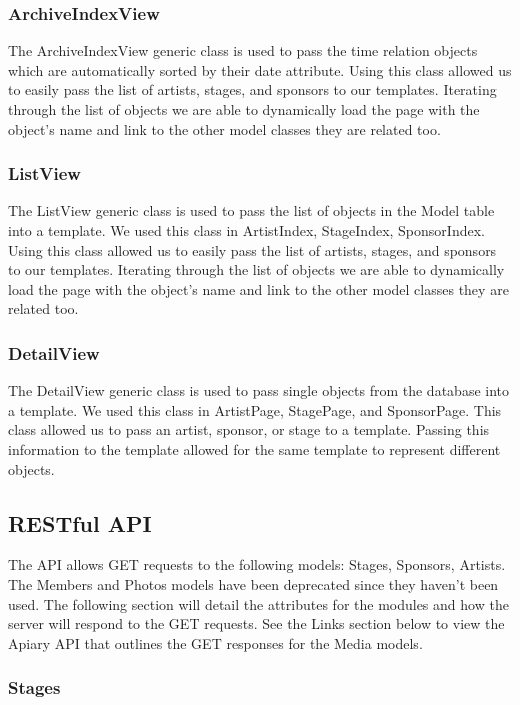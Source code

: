 \documentclass[12pt,english]{scrartcl}
\begin{document}
\subsubsection{ArchiveIndexView}
The ArchiveIndexView generic class is used to pass the time relation objects which are automatically sorted 
by their date attribute. Using this class allowed us to easily pass the list of artists, stages, and sponsors to our templates.
Iterating through the list of objects we are able to dynamically load the page with the object's name and link to the other model classes they are related too.

\subsubsection{ListView}
The ListView generic class is used to pass the list of objects in the Model table into a template. We used this class in ArtistIndex, StageIndex, SponsorIndex.
Using this class allowed us to easily pass the list of artists, stages, and sponsors to our templates. Iterating through the list of objects we are able to dynamically
load the page with the object's name and link to the other model classes they are related too.

\subsubsection{DetailView}

The DetailView generic class is used to pass single objects from the database into a template. We used this
class in ArtistPage, StagePage, and SponsorPage. This class allowed us to pass an artist, sponsor, or stage to a template. Passing this information to the template allowed for the same template to represent different objects.

\subsection{RESTful  API}

The API allows GET requests to the following models: Stages, Sponsors, Artists. The  Members and Photos models have been deprecated since they haven't been used.
The following section will detail the attributes for the modules and how the server will respond to the GET requests. See 
the Links section below to view the Apiary API that outlines the GET responses for the Media models.

\subsubsection{Stages}
\end{document}
